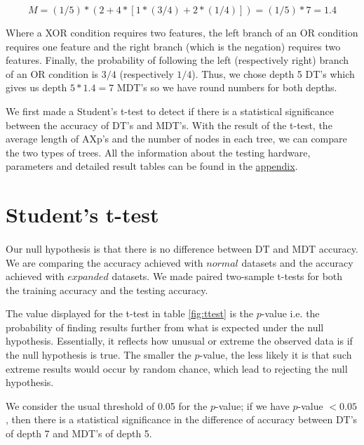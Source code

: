 \documentclass[12pt]{report}
\theoremstyle{definition}
\theoremstyle{definition}
\theoremstyle{definition}
\begin{document}
\[ M = (1/5) * ( 2 + 4 * [ 1 * (3/4) + 2 * (1/4)] ) = (1/5) * 7 = 1.4 \]

Where a XOR condition requires two features, the left branch of an OR condition requires one feature and the right branch (which is the negation) requires two features. Finally, the probability of following the left (respectively right) branch of an OR condition is $3/4$ (respectively $1/4$). Thus, we chose depth 5 DT's which gives us depth $5 * 1.4 = 7$ MDT's so we have round numbers for both depths. 

We first made a Student's t-test to detect if there is a statistical significance between the accuracy of DT's and MDT's. With the result of the t-test, the average length of AXp's and the number of nodes in each tree, we can compare the two types of trees. All the information about the testing hardware, parameters and detailed result tables can be found in the \hyperref[chap:appendix]{appendix}.

\newpage

\section{Student's t-test}
\paragraph{} Our null hypothesis is that there is no difference between DT and MDT accuracy. We are comparing the accuracy achieved with $normal$ datasets and the accuracy achieved with $expanded$ datasets. We made paired two-sample t-tests for both the training accuracy and the testing accuracy. 

The value displayed for the t-test in table \ref{fig:ttest} is the $p$-value i.e. the probability of finding results further from what is expected under the null hypothesis. Essentially, it reflects how unusual or extreme the observed data is if the null hypothesis is true. The smaller the $p$-value, the less likely it is that such extreme results would occur by random chance, which lead to rejecting the null hypothesis. 

We consider the usual threshold of 0.05 for the $p$-value; if we have $p$-value $< 0.05$, then there is a statistical significance in the difference of accuracy between DT's of depth 7 and MDT's of depth 5.
\end{document}
